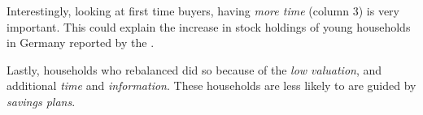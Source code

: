 \documentclass[ProjectABM]{subfiles}
\begin{document}
Interestingly, looking at first time buyers, having \textit{more time} (column 3) is very important. This could explain the increase in stock holdings of young households in Germany reported by the \cite{DAI_2021}.

Lastly, households who rebalanced did so because of the \textit{low valuation}, and additional \textit{time} and \textit{information}. These households are less likely to are guided by \textit{savings plans}.




\end{document}
